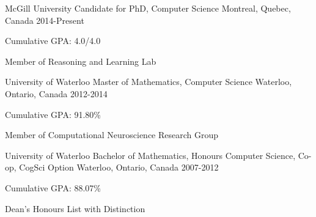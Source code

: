 \begin{cventries}
  \cventry
    {McGill University}
    {Candidate for PhD, Computer Science}
    {Montreal, Quebec, Canada}
    {2014-Present}
    {
        \begin{cvitems}
            \item {Cumulative GPA: 4.0/4.0}
            \item {Member of Reasoning and Learning Lab}
        \end{cvitems}
     }
  \cventry
    {University of Waterloo}
    {Master of Mathematics, Computer Science}
    {Waterloo, Ontario, Canada}
    {2012-2014}
    {
        \begin{cvitems}
            \item {Cumulative GPA: 91.80\%}
            \item {Member of Computational Neuroscience Research Group}
        \end{cvitems}
    }
  \cventry
    {University of Waterloo}
    {Bachelor of Mathematics, Honours Computer Science, Co-op, CogSci Option}
    {Waterloo, Ontario, Canada}
    {2007-2012}
    {
        \begin{cvitems}
            \item {Cumulative GPA: 88.07\%}
       	    \item {Dean's Honours List with Distinction}
        \end{cvitems}
     }
\end{cventries}